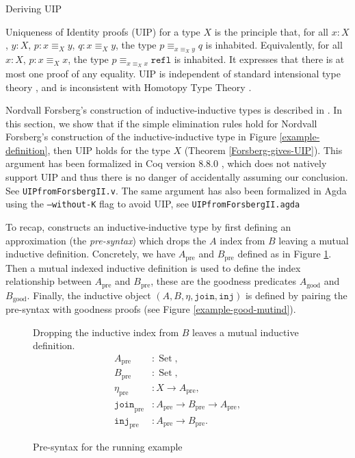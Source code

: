 \documentclass[runningheads]{llncs}
\DeclareMathOperator{\USet}{Set}
\newcommand{\pre}[1]{{#1}_\text{pre}}
\newcommand{\good}[1]{{#1}_\text{good}}
\newcommand{\IdA}[3]{{#1}\equiv_{#3}{#2}}
\newcommand{\join}{\texttt{join}}
\newcommand{\inj}{\texttt{inj}}
\newcommand{\refl}{\texttt{refl}}
\def\Forsberg/{Nordvall Forsberg}
\begin{document}
\begin{section}{Deriving UIP}\label{derivingUIP}

Uniqueness of Identity proofs (UIP) for a type $X$ is the principle that, for all $x : X$, $y : X$, $p : \IdA{x}{y}{X}$, $q : \IdA{x}{y}{X}$, the type $\IdA{p}{q}{\IdA{x}{y}{X}}$ is inhabited. Equivalently, for all $x : X$, $p : \IdA{x}{x}{X}$, the type $\IdA{p}{\refl}{\IdA{x}{x}{X}}$ is inhabited. It expresses that there is at most one proof of any equality. UIP is independent of standard intensional type theory \citep{groupoidmodel}, and is inconsistent with Homotopy Type Theory \citep{hottbook}.

\Forsberg/'s construction of inductive-inductive types is described in \citep[\S5.3]{nordvallforsberg2013thesis}. In this section, we show that if the simple elimination rules hold for \Forsberg/'s construction of the inductive-inductive type in Figure \ref{example-definition}, then UIP holds for the type $X$ (Theorem \ref{Forsberg-gives-UIP}).
This argument has been formalized in Coq version 8.8.0 \citep{Coq880}, which does not natively support UIP and thus there is no danger of accidentally assuming our conclusion. See \texttt{UIP\textunderscore{}from\textunderscore{}Forsberg\textunderscore{}II.v}. The same argument has also been formalized in Agda using the \texttt{--without-K} flag to avoid UIP, see \texttt{UIP\textunderscore{}from\textunderscore{}Forsberg\textunderscore{}II.agda}

To recap, \citet[\S5.3]{nordvallforsberg2013thesis} constructs an inductive-inductive type by first defining an approximation (the \emph{pre-syntax}) which drops the $A$ index from $B$ leaving a mutual inductive definition. Concretely, we have $\pre{A}$ and $\pre{B}$ defined as in Figure \ref{example-pre-syntax}. Then a mutual indexed inductive definition is used to define the index relationship between $\pre{A}$ and $\pre{B}$, these are the goodness predicates $\good{A}$ and $\good{B}$. Finally, the inductive object $(A, B, \eta, \join, \inj)$ is defined by pairing the pre-syntax with goodness proofs (see Figure \ref{example-good-mutind}).

\begin{figure}[htpb]
    \begin{flushleft}
        Dropping the inductive index from $B$ leaves a mutual inductive definition.
        \begin{align*}
        \pre{A}&:\USet,\\
        \pre{B}&:\USet,\\
        \pre{\eta}&:X\to\pre{A},\\
        \pre{\join}&:\pre{A}\to\pre{B}\to\pre{A},\\
        \pre{\inj}&:\pre{A}\to\pre{B}.
        \end{align*}
    \end{flushleft}
    \caption{\label{example-pre-syntax}Pre-syntax for the running example}
\end{figure}


\end{section}
\end{document}
